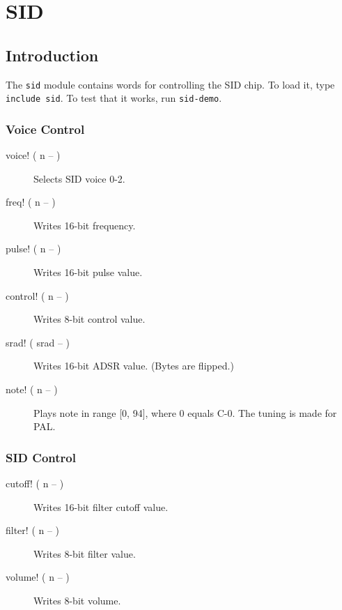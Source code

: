 \chapter{SID}

\section{Introduction}

The \texttt{sid} module contains words for controlling the SID chip. To load it, type \texttt{include sid}. To test that it works, run \texttt{sid-demo}.

\subsection{Voice Control}

\begin{description}
    \item[voice! ( n -- )] Selects SID voice 0-2.
    \item[freq! ( n -- )] Writes 16-bit frequency.
    \item[pulse! ( n -- )] Writes 16-bit pulse value.
    \item[control! ( n -- )] Writes 8-bit control value.
    \item[srad! ( srad -- )] Writes 16-bit ADSR value. (Bytes are flipped.)
    \item[note! ( n -- )] Plays note in range [0, 94], where 0 equals C-0. The tuning is made for PAL.
\end{description}

\subsection{SID Control}

\begin{description}
    \item[cutoff! ( n -- )] Writes 16-bit filter cutoff value.
    \item[filter! ( n -- )] Writes 8-bit filter value.
    \item[volume! ( n -- )] Writes 8-bit volume.
\end{description}

